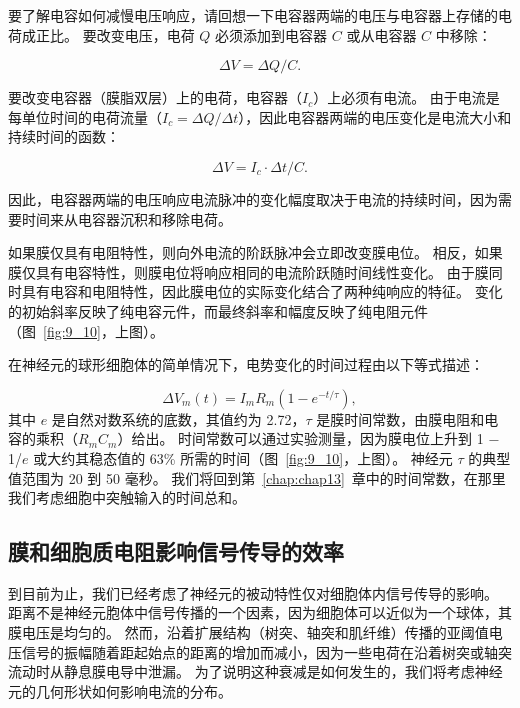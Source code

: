 要了解电容如何减慢电压响应，请回想一下电容器两端的电压与电容器上存储的电荷成正比。 
要改变电压，电荷 $Q$ 必须添加到电容器 $C$ 或从电容器 $C$ 中移除：

\begin{equation}
	\Delta V = \Delta Q/C.
\end{equation}


要改变电容器（膜脂双层）上的电荷，电容器（$I_c$）上必须有电流。
由于电流是每单位时间的电荷流量（$I_c = \Delta Q/ \Delta t $），因此电容器两端的电压变化是电流大小和持续时间的函数：

\begin{equation}
	\Delta V = I_c \cdot \Delta t / C.
\end{equation}


因此，电容器两端的电压响应电流脉冲的变化幅度取决于电流的持续时间，因为需要时间来从电容器沉积和移除电荷。


如果膜仅具有电阻特性，则向外电流的阶跃脉冲会立即改变膜电位。
相反，如果膜仅具有电容特性，则膜电位将响应相同的电流阶跃随时间线性变化。
由于膜同时具有电容和电阻特性，因此膜电位的实际变化结合了两种纯响应的特征。
变化的初始斜率反映了纯电容元件，而最终斜率和幅度反映了纯电阻元件（图~\ref{fig:9_10}，上图）。


在神经元的球形细胞体的简单情况下，电势变化的时间过程由以下等式描述：

\begin{equation}
	\Delta V_m (t) = I_m R_m (1 - e^{-t/\tau}),
\end{equation}
其中 $e$ 是自然对数系统的底数，其值约为 2.72，$\tau$ 是膜时间常数，由膜电阻和电容的乘积（$R_m C_m$）给出。
时间常数可以通过实验测量，因为膜电位上升到 1 − 1/$e$ 或大约其稳态值的 63\% 所需的时间（图~\ref{fig:9_10}，上图）。 
神经元 $\tau$ 的典型值范围为 20 到 50 毫秒。
我们将回到第~\ref{chap:chap13}~章中的时间常数，在那里我们考虑细胞中突触输入的时间总和。



\subsection{膜和细胞质电阻影响信号传导的效率}

到目前为止，我们已经考虑了神经元的被动特性仅对细胞体内信号传导的影响。
距离不是神经元胞体中信号传播的一个因素，因为细胞体可以近似为一个球体，其膜电压是均匀的。
然而，沿着扩展结构（树突、轴突和肌纤维）传播的亚阈值电压信号的振幅随着距起始点的距离的增加而减小，因为一些电荷在沿着树突或轴突流动时从静息膜电导中泄漏。
为了说明这种衰减是如何发生的，我们将考虑神经元的几何形状如何影响电流的分布。


